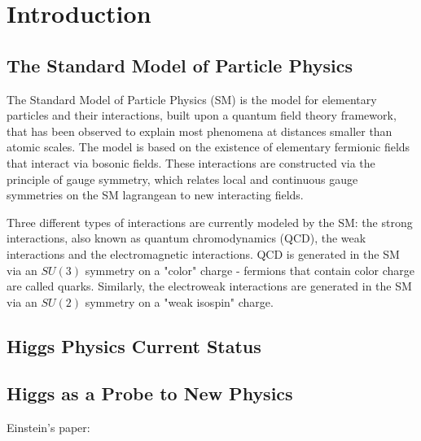 \chapter{Introduction}

\section{The Standard Model of Particle Physics}

The Standard Model of Particle Physics (SM) is the model for elementary particles and their interactions, built upon a quantum field theory framework, that has been observed to explain most phenomena at distances smaller than atomic scales. 
The model is based on the existence of elementary fermionic fields that interact via bosonic fields. 
These interactions are constructed via the principle of gauge symmetry, which relates local and continuous gauge symmetries on the SM lagrangean to new interacting fields. 

Three different types of interactions are currently modeled by the SM: the strong interactions, also known as quantum chromodynamics (QCD), the weak interactions and the electromagnetic interactions. 
QCD is  generated in the SM via an $SU(3)$ symmetry on a "color" charge - fermions that contain color charge are called quarks. 
Similarly, the electroweak interactions are generated in the SM via an $SU(2)$ symmetry on a "weak isospin" charge. 

\section{Higgs Physics Current Status}
\section{Higgs as a Probe to New Physics}
Einstein's paper: \cite{Einstein}
